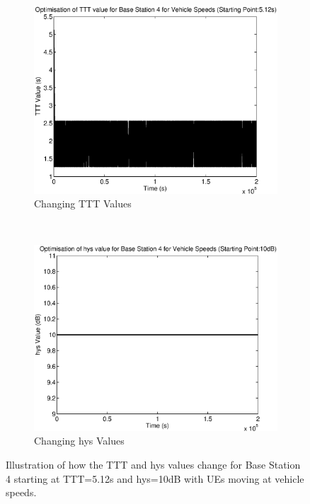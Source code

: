 \begin{figure}[H]
        \centering
        \begin{subfigure}[b]{0.49\textwidth}
                \includegraphics[width=\textwidth]{figures/graphs/vehhigh/TTT4.eps}
                \caption{Changing TTT Values}
        \end{subfigure}%
        ~ %
        \begin{subfigure}[b]{0.49\textwidth}
                \includegraphics[width=\textwidth]{figures/graphs/vehhigh/hys4.eps}
                \caption{Changing hys Values}
        \end{subfigure}
        \caption{Illustration of how the TTT and hys values change for Base Station 4 starting at TTT=5.12s and hys=10dB with UEs moving at vehicle speeds.}
\end{figure}
